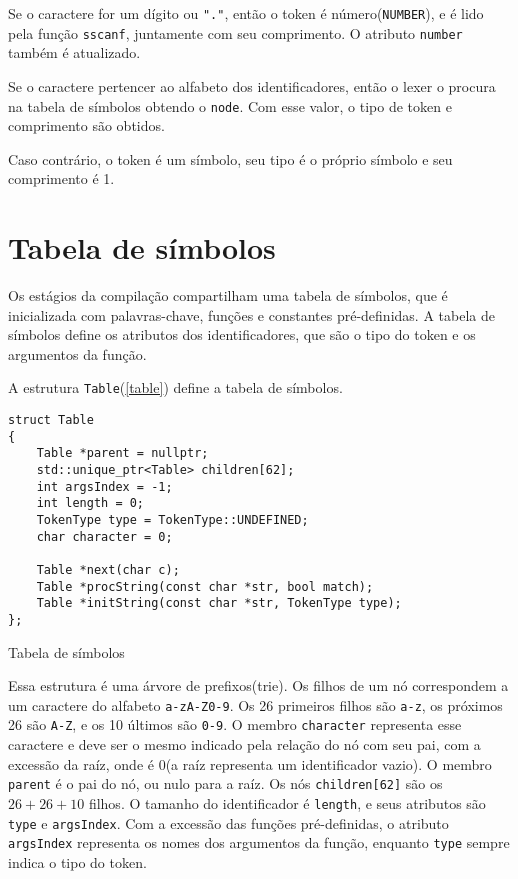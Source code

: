 \documentclass[10pt,a4paper]{article}
\newenvironment{code}{\captionsetup{type=listing}}{}
\begin{document}
Se o caractere for um dígito ou \texttt{"."}, então o token é número(\texttt{NUMBER}),
e é lido pela função \texttt{sscanf}, juntamente com seu comprimento. O atributo \texttt{number} também é atualizado.

Se o caractere pertencer ao alfabeto dos identificadores,
então o lexer o procura na tabela de símbolos obtendo o \texttt{node}.
Com esse valor, o tipo de token e comprimento são obtidos.

Caso contrário, o token é um símbolo, seu tipo é o próprio símbolo e seu comprimento é 1.
\newpage
\section{Tabela de símbolos}
Os estágios da compilação compartilham uma tabela de símbolos, que é inicializada com palavras-chave,
funções e constantes pré-definidas.
A tabela de símbolos define os atributos dos identificadores,
que são o tipo do token e os argumentos da função. 

A estrutura \texttt{Table}(\ref{table}) define a tabela de símbolos.

\begin{code}
\begin{verbatim}
struct Table
{
    Table *parent = nullptr;
    std::unique_ptr<Table> children[62];
    int argsIndex = -1;
    int length = 0;
    TokenType type = TokenType::UNDEFINED;
    char character = 0;

    Table *next(char c);
    Table *procString(const char *str, bool match);
    Table *initString(const char *str, TokenType type);
};
\end{verbatim}
\caption{Tabela de símbolos}
\label{table}
\end{code}

Essa estrutura é uma árvore de prefixos(trie).
Os filhos de um nó correspondem a um caractere do alfabeto \texttt{a-zA-Z0-9}.
Os 26 primeiros filhos são \texttt{a-z}, os próximos 26 são \texttt{A-Z}, e os 10 últimos são \texttt{0-9}.
O membro \texttt{character} representa esse caractere e deve ser o mesmo indicado pela relação do nó com seu pai,
com a excessão da raíz, onde é 0(a raíz representa um identificador vazio).
O membro \texttt{parent} é o pai do nó, ou nulo para a raíz.
Os nós \texttt{children[62]} são os $26+26+10$ filhos.
O tamanho do identificador é \texttt{length}, e seus atributos são \texttt{type} e \texttt{argsIndex}.
Com a excessão das funções pré-definidas, o atributo \texttt{argsIndex} representa os nomes dos argumentos da função,
enquanto \texttt{type} sempre indica o tipo do token.
\end{document}
